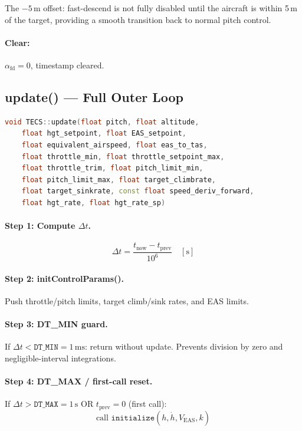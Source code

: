 \documentclass[12pt,a4paper]{article}
\begin{document}
The $-5\,\text{m}$ offset: fast-descend is not fully disabled until
the aircraft is within 5\,m of the target, providing a smooth transition
back to normal pitch control.

\paragraph{Clear:} $\alpha_{\text{fd}} = 0$, timestamp cleared.

\subsection{update() --- Full Outer Loop}

\begin{lstlisting}[language=C++]
void TECS::update(float pitch, float altitude,
    float hgt_setpoint, float EAS_setpoint,
    float equivalent_airspeed, float eas_to_tas,
    float throttle_min, float throttle_setpoint_max,
    float throttle_trim, float pitch_limit_min,
    float pitch_limit_max, float target_climbrate,
    float target_sinkrate, const float speed_deriv_forward,
    float hgt_rate, float hgt_rate_sp)
\end{lstlisting}

\paragraph{Step 1: Compute $\Delta t$.}
\begin{equation}
  \Delta t = \frac{t_{\text{now}} - t_{\text{prev}}}{10^6} \quad [\text{s}]
\end{equation}

\paragraph{Step 2: initControlParams().}
Push throttle/pitch limits, target climb/sink rates, and EAS limits.

\paragraph{Step 3: DT\_MIN guard.}
If $\Delta t < \texttt{DT\_MIN} = 1\,\text{ms}$: return without update.
Prevents division by zero and negligible-interval integrations.

\paragraph{Step 4: DT\_MAX / first-call reset.}
If $\Delta t > \texttt{DT\_MAX} = 1\,\text{s}$ OR
$t_{\text{prev}} = 0$ (first call):
\begin{equation}
  \text{call } \texttt{initialize}(h, \dot{h}, V_{\text{EAS}}, k)
\end{equation}
\end{document}
